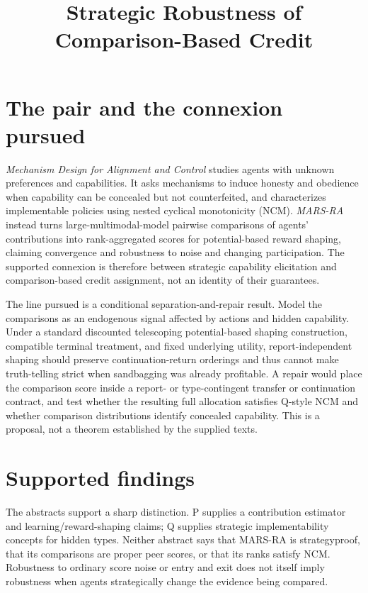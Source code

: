 \documentclass{article}
\title{Strategic Robustness of Comparison-Based Credit}
\begin{document}
\maketitle

\section{The pair and the connexion pursued}

\emph{Mechanism Design for Alignment and Control} studies agents with unknown preferences and capabilities.  It asks mechanisms to induce honesty and obedience when capability can be concealed but not counterfeited, and characterizes implementable policies using nested cyclical monotonicity (NCM).  \emph{MARS-RA} instead turns large-multimodal-model pairwise comparisons of agents' contributions into rank-aggregated scores for potential-based reward shaping, claiming convergence and robustness to noise and changing participation.  The supported connexion is therefore between strategic capability elicitation and comparison-based credit assignment, not an identity of their guarantees. 

The line pursued is a conditional separation-and-repair result.  Model the comparisons as an endogenous signal affected by actions and hidden capability.  Under a standard discounted telescoping potential-based shaping construction, compatible terminal treatment, and fixed underlying utility, report-independent shaping should preserve continuation-return orderings and thus cannot make truth-telling strict when sandbagging was already profitable.  A repair would place the comparison score inside a report- or type-contingent transfer or continuation contract, and test whether the resulting full allocation satisfies Q-style NCM and whether comparison distributions identify concealed capability.  This is a proposal, not a theorem established by the supplied texts. 

\section{Supported findings}

The abstracts support a sharp distinction.  P supplies a contribution estimator and learning/reward-shaping claims; Q supplies strategic implementability concepts for hidden types.  Neither abstract says that MARS-RA is strategyproof, that its comparisons are proper peer scores, or that its ranks satisfy NCM.  Robustness to ordinary score noise or entry and exit does not itself imply robustness when agents strategically change the evidence being compared. 
\end{document}
